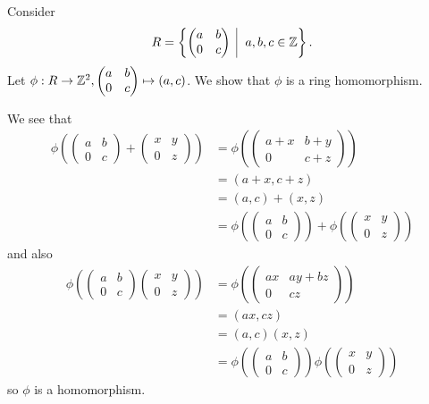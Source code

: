 \begin{example}
    Consider
    \[
        R = \left\{\begin{pmatrix}a&b\\0&c\end{pmatrix}\vert a,b,c\in\Z\right\}.
    \]
    Let $\phi: R \to \mathbb{Z}^2, \begin{pmatrix}a&b\\0&c\end{pmatrix} \mapsto (a,c)$. We show that $\phi$ is a ring homomorphism.

    We see that
    \begin{align*}
        \phi\left(\begin{pmatrix}a&b\\0&c\end{pmatrix} + \begin{pmatrix}x&y\\0&z\end{pmatrix}\right) &= \phi\left(\begin{pmatrix}a+x&b+y\\0&c+z\end{pmatrix}\right)\\
        &= (a+x,c+z)\\
        &= (a,c) + (x,z)\\
        &= \phi\left(\begin{pmatrix}a&b\\0&c\end{pmatrix}\right) + \phi\left(\begin{pmatrix}x&y\\0&z\end{pmatrix}\right)
    \end{align*}
    and also
    \begin{align*}
        \phi\left(\begin{pmatrix}a&b\\0&c\end{pmatrix}\begin{pmatrix}x&y\\0&z\end{pmatrix}\right) &= \phi\left(\begin{pmatrix}ax&ay+bz\\0&cz\end{pmatrix}\right)\\
        &= (ax, cz)\\
        &= (a,c)(x,z)\\
        &= \phi\left(\begin{pmatrix}a&b\\0&c\end{pmatrix}\right)\phi\left(\begin{pmatrix}x&y\\0&z\end{pmatrix}\right)
    \end{align*}
    so $\phi$ is a homomorphism.
\end{example}

